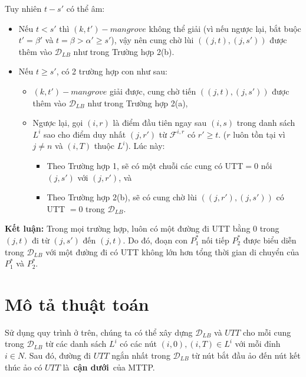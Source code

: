 \documentclass[../main.tex]{subfiles}
\begin{document}
Tuy nhiên \(t-s'\) có thể âm:

\begin{itemize}
\tightlist
\item
  Nếu \(t<s'\) thì \((k,t')-mangrove\) không thể giải (vì nếu ngược lại,
  bắt buộc \(t'=\beta'\) và \(t=\beta>\alpha'\geq s'\)), vậy nên cung
  chờ lùi \(((j,t),(j,s'))\) được thêm vào \(\mathcal D_{LB}\) như trong
  Trường hợp 2(b).
\item
  Nếu \(t\geq s'\), có 2 trường hợp con như sau:

  \begin{itemize}
  \tightlist
  \item
    \((k,t')-mangrove\) giải được, cung chờ tiến \(((j,t),(j,s'))\) được
    thêm vào \(\mathcal D_{LB}\) như trong Trường hợp 2(a),
  \item
    Ngược lại, gọi \((i,r)\) là điểm đầu tiên ngay sau \((i,s)\) trong
    danh sách \(L^i\) sao cho điểm duy nhất \((j,r')\) từ
    \(\mathcal F^{i,r}\) có \(r' \geq t\). (\(r\) luôn tồn tại vì
    \(j\neq n\) và \((i,T)\) thuộc \(L^i\)). Lúc này:

    \begin{itemize}
    \tightlist
    \item
      Theo Trường hợp 1, sẽ có một chuỗi các cung có UTT\(=0\) nối
      \((j,s')\) với \((j,r')\), và
    \item
      Theo Trường hợp 2(b), sẽ có cung chờ lùi \(((j, r'), (j, s'))\) có
      UTT \(=0\) trong \(\mathcal D_{LB}\).
    \end{itemize}
  \end{itemize}
\end{itemize}

\textbf{Kết luận:} Trong mọi trường hợp, luôn có một đường đi UTT bằng 0 trong
\((j, t)\) đi từ \((j, s')\) đến \((j, t)\). Do đó, đoạn con \(P_1^*\)
nối tiếp \(P_2^*\) được biểu diễn trong \(\mathcal D_{LB}\) với một
đường đi có UTT không lớn hơn tổng thời gian di chuyển của \(P_1^*\) và
\(P_2^*\).

\section{Mô tả thuật toán}\label{muxf4-tux1ea3-thuux1eadt-touxe1n}

\begin{proposition}
Sử dụng quy trình ở trên, chúng ta có thể xây dựng
\(\mathcal D_{LB}\) và \(UTT\) cho mỗi cung trong \(\mathcal D_{LB}\) từ
các danh sách \(L^i\) có các nút \((i,0),(i,T) \in L^i\) với mỗi đỉnh
\(i \in N\). Sau đó, đường đi \(UTT\) ngắn nhất trong
\(\mathcal D_{LB}\) từ nút bắt đầu ảo đến nút kết thúc ảo có \(UTT\)
là~\textbf{cận dưới}~của MTTP.
\end{proposition}
\end{document}
